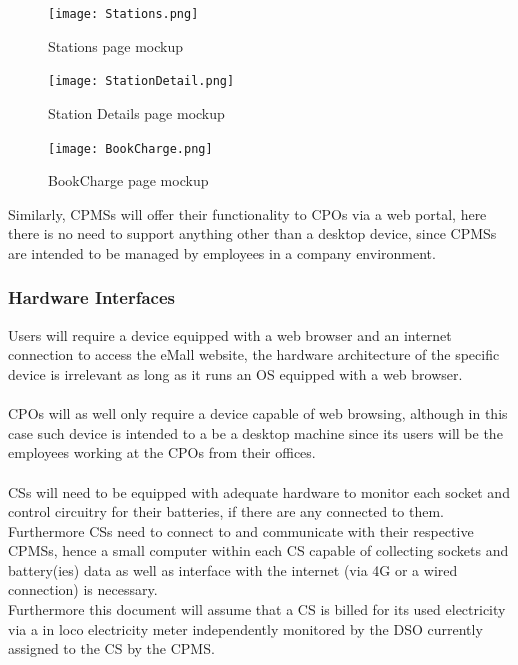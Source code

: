 \documentclass[11pt]{article}
\begin{document}
\begin{figure}[!ht]
    \centering
    \texttt{[image: Stations.png]}
    \caption{Stations page mockup}
    \label{fig:my_label}
\end{figure}

\newpage

\begin{figure}[!ht]
    \centering
    \texttt{[image: StationDetail.png]}
    \caption{Station Details page mockup}
    \label{fig:my_label}
\end{figure}

\begin{figure}[!ht]
    \centering
    \texttt{[image: BookCharge.png]}
    \caption{BookCharge page mockup}
    \label{fig:my_label}
\end{figure}

Similarly, CPMSs will offer their functionality to CPOs via a web portal, here there is no need to support anything other than a desktop device, since CPMSs are intended to be managed by employees in a company environment.

\newpage

\subsubsection{Hardware Interfaces}

Users will require a device equipped with a web browser and an internet connection to access the eMall website, the hardware architecture of the specific device is irrelevant as long as it runs an OS equipped with a web browser. \\
\\
CPOs will as well only require a device capable of web browsing, although in this case such device is intended to a be a desktop machine since its users will be the employees working at the CPOs from their offices. \\
\\
CSs will need to be equipped with adequate hardware to monitor each socket and control circuitry for their batteries, if there are any connected to them. Furthermore CSs need to connect to and communicate with their respective CPMSs, hence a small computer within each CS capable of collecting sockets and battery(ies) data as well as interface with the internet (via 4G or a wired connection) is necessary. \\
Furthermore this document will assume that a CS is billed for its used electricity via a in loco electricity meter independently monitored by the DSO currently assigned to the CS by the CPMS.
\end{document}
